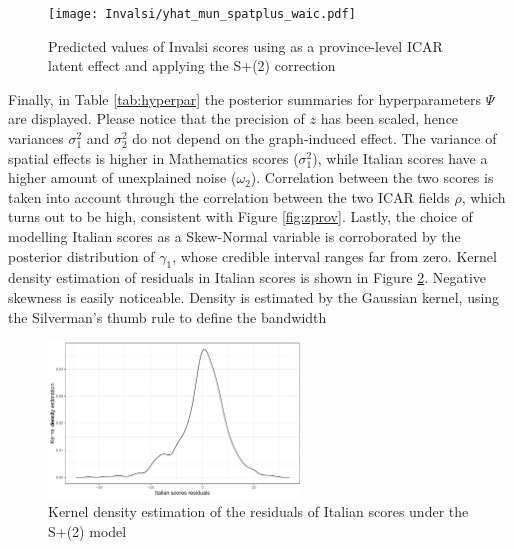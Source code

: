 \documentclass[openany]{book}
\begin{document}
\begin{figure}
  \centering
  \texttt{[image: Invalsi/yhat\_mun\_spatplus\_waic.pdf]} 
  \caption{Predicted values of Invalsi scores using as a province-level ICAR latent effect and applying the S+(2) correction}
  \label{fig:yhatmun}
\end{figure}

Finally, in Table \ref{tab:hyperpar} the posterior summaries for hyperparameters $\Psi$ are displayed. Please notice that the precision of $z$ has been scaled, hence variances $\sigma_1^2$ and $\sigma_2^2$ do not depend on the graph-induced effect. The variance of spatial effects is higher in Mathematics scores ($\sigma_1^2$), while Italian scores have a higher amount of unexplained noise ($\omega_2$). Correlation between the two scores is taken into account through the correlation between the two ICAR fields $\rho$, which turns out to be high, consistent with Figure \ref{fig:zprov}.
Lastly, the choice of modelling Italian scores as a Skew-Normal variable is corroborated by the posterior distribution of $\gamma_1$, whose credible interval ranges far from zero. Kernel density estimation of residuals in Italian scores %
is shown in Figure \ref{fig:kernel}. Negative skewness is easily noticeable. Density is estimated by the Gaussian kernel, using the Silverman's thumb rule to define the bandwidth \citep[][Section 3.4.2]{Silverman}
\begin{figure}
  \centering
  \includegraphics[width=0.6\textwidth]{Invalsi/KDE_ITA_base.pdf} 
  \caption{Kernel density estimation of the residuals of Italian scores under the S+(2) model}
  \label{fig:kernel}
\end{figure}
\end{document}
